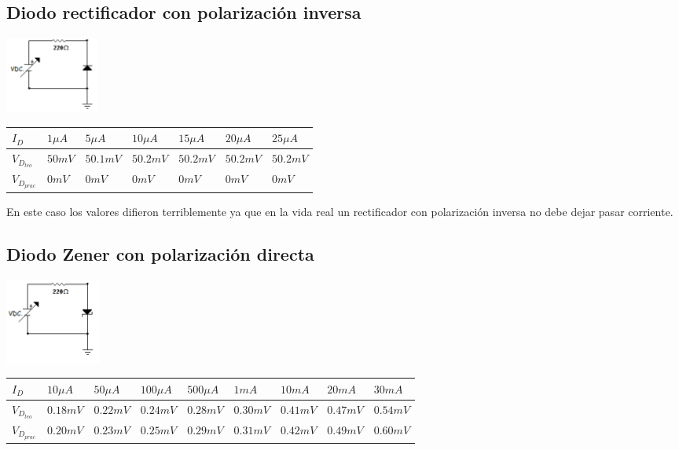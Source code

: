 \documentclass{mylib/reporteConCalif}
\begin{document}
\subsection*{Diodo rectificador con polarización inversa}
\begin{center}
	\includegraphics[scale=1]{img/labdisp_pract3/diodorec_i}


	\begin{tabu} to 0.8\textwidth { | X[c] | X[c] | X[c] | X[c] | X[c] | X[c] | X[c] |  }
	 \hline
	 $I_{D}$ & $1 \mu A$ & $5 \mu A$ & $10 \mu A$ & $15 \mu A$ & $20 \mu A$ & $25 \mu A$ \\
	 \hline
	 $V_{D_{teo}}$ & $50 mV$ & $50.1 mV$ & $50.2 mV$ & $50.2 mV$ & $50.2 mV$ & $50.2 mV$ \\
	\hline
	 $V_{D_{prac}}$ & $0 mV$ & $0 mV$ & $0 mV$ & $0 mV$ & $0 mV$ & $0 mV$ \\
	\hline
	\end{tabu}

\end{center}

En este caso los valores difieron terriblemente ya que en la vida real un rectificador con polarización inversa no debe dejar pasar corriente.

\subsection*{Diodo Zener con polarización directa}
\begin{center}
	\includegraphics[scale=1]{img/labdisp_pract3/diodoz_d}


	\begin{tabu} to 0.8\textwidth { | X[c] | X[c] | X[c] | X[c] | X[c] | X[c] | X[c] | X[c] | X[c] | }
	 \hline
	 $I_{D}$ & $10 \mu A$ & $50 \mu A$ & $100 \mu A$ & $500 \mu A$ & $1 mA$ & $10 mA$ & $20 mA$ & $30 mA$\\
	 \hline
	 $V_{D_{teo}}$ & $0.18 mV$ & $0.22 mV$ & $0.24 mV$ & $0.28 mV$ & $0.30 mV$ & $0.41 mV$ & $0.47 mV$ & $0.54 mV$\\
	\hline
	$V_{D_{prac}}$ & $0.20 mV$ & $0.23 mV$ & $0.25 mV$ & $0.29 mV$ & $0.31 mV$ & $0.42 mV$ & $0.49 mV$ & $0.60 mV$\\
	\hline
	\end{tabu}

\end{center}
\end{document}

